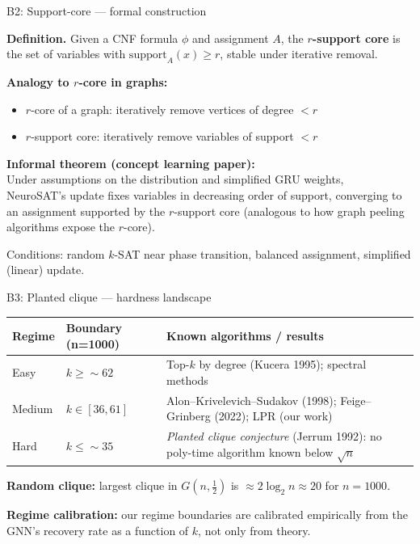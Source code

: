 \documentclass[aspectratio=169,10pt,dvipsnames]{beamer}
\begin{document}
\begin{frame}{B2: Support-core — formal construction}

\textbf{Definition.} Given a CNF formula $\phi$ and assignment $A$, the \textbf{$r$-support core}
is the set of variables with $\mathrm{support}_A(x) \ge r$, stable under iterative removal.

\medskip
\textbf{Analogy to $r$-core in graphs:}
\begin{itemize}
  \item $r$-core of a graph: iteratively remove vertices of degree $< r$
  \item $r$-support core: iteratively remove variables of support $< r$
\end{itemize}

\medskip
\textbf{Informal theorem (concept learning paper):}\\
Under assumptions on the distribution and simplified GRU weights,\\
NeuroSAT's update fixes variables in decreasing order of support, converging to an assignment
supported by the $r$-support core (analogous to how graph peeling algorithms expose the $r$-core).

\medskip\small
Conditions: random $k$-SAT near phase transition, balanced assignment, simplified (linear) update.
\end{frame}

\begin{frame}{B3: Planted clique — hardness landscape}

\small\renewcommand{\arraystretch}{1.4}
\begin{tabular}{@{}p{2cm}p{3cm}p{5.5cm}@{}}
\toprule
\textbf{Regime} & \textbf{Boundary (n=1000)} & \textbf{Known algorithms / results} \\
\midrule
Easy & $k \ge \sim 62$ & Top-$k$ by degree (Kucera 1995); spectral methods \\
Medium & $k \in [36, 61]$ & Alon–Krivelevich–Sudakov (1998); Feige–Grinberg (2022); LPR (our work) \\
Hard & $k \le \sim 35$ & \textit{Planted clique conjecture} (Jerrum 1992): no poly-time algorithm known below $\sqrt{n}$ \\
\bottomrule
\end{tabular}

\medskip
\textbf{Random clique:} largest clique in $G(n,\tfrac{1}{2})$ is $\approx 2\log_2 n \approx 20$ for $n=1000$.

\medskip
\textbf{Regime calibration:} our regime boundaries are calibrated empirically from the GNN's recovery
rate as a function of $k$, not only from theory.
\end{frame}
\end{document}
